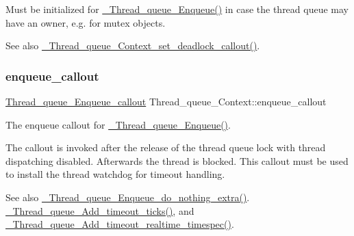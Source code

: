 Must be initialized for \mbox{\hyperlink{group__RTEMSScoreThreadQueue_ga4992b40810f6d287c832bdad240dbc90}{\+\_\+\+Thread\+\_\+queue\+\_\+\+Enqueue()}} in case the thread queue may have an owner, e.\+g. for mutex objects.

\begin{DoxySeeAlso}{See also}
\mbox{\hyperlink{group__RTEMSScoreThreadQueue_gab024e7369bc091e53e7bb04ed8ebfb61}{\+\_\+\+Thread\+\_\+queue\+\_\+\+Context\+\_\+set\+\_\+deadlock\+\_\+callout()}}. 
\end{DoxySeeAlso}
\mbox{\label{structThread__queue__Context_a055ed1eda48ec4c2f7705dc8da30a0f5}} 
\subsubsection{\texorpdfstring{enqueue\_callout}{enqueue\_callout}}
{\footnotesize\ttfamily \mbox{\hyperlink{group__RTEMSScoreThreadQueue_ga3dd59055cd68c42978de9cd8e007ce1d}{Thread\+\_\+queue\+\_\+\+Enqueue\+\_\+callout}} Thread\+\_\+queue\+\_\+\+Context\+::enqueue\+\_\+callout}



The enqueue callout for \mbox{\hyperlink{group__RTEMSScoreThreadQueue_ga4992b40810f6d287c832bdad240dbc90}{\+\_\+\+Thread\+\_\+queue\+\_\+\+Enqueue()}}. 

The callout is invoked after the release of the thread queue lock with thread dispatching disabled. Afterwards the thread is blocked. This callout must be used to install the thread watchdog for timeout handling.

\begin{DoxySeeAlso}{See also}
\mbox{\hyperlink{group__RTEMSScoreThreadQueue_ga6a087492df4bba9c56d8e8018339a84e}{\+\_\+\+Thread\+\_\+queue\+\_\+\+Enqueue\+\_\+do\+\_\+nothing\+\_\+extra()}}. \mbox{\hyperlink{group__RTEMSScoreThreadQueue_gae6191fb5cd1e33990f9b505f12c39734}{\+\_\+\+Thread\+\_\+queue\+\_\+\+Add\+\_\+timeout\+\_\+ticks()}}, and \mbox{\hyperlink{group__RTEMSScoreThreadQueue_ga14552dcef85b4627e1b2d150f7245f81}{\+\_\+\+Thread\+\_\+queue\+\_\+\+Add\+\_\+timeout\+\_\+realtime\+\_\+timespec()}}. 
\end{DoxySeeAlso}
\mbox{\label{structThread__queue__Context_a36a6badeab2bd419fa9ac0ef34ce1abf}} 
